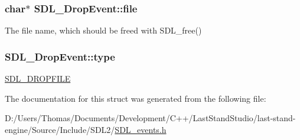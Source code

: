 \subsubsection[{file}]{\setlength{\rightskip}{0pt plus 5cm}char$\ast$ S\+D\+L\+\_\+\+Drop\+Event\+::file}\label{structSDL__DropEvent_abc41ef4beb62e1d8b56827128b29585f}
The file name, which should be freed with S\+D\+L\+\_\+free() \hypertarget{structSDL__DropEvent_a5ea27cfaa5f8d4940e9a69b68b3cc035}{}
\subsubsection[{type}]{ S\+D\+L\+\_\+\+Drop\+Event\+::type}\label{structSDL__DropEvent_a5ea27cfaa5f8d4940e9a69b68b3cc035}
\hyperlink{SDL__events_8h_a3b589e89be6b35c02e0dd34a55f3fccaad9238862d7aeaebff88be6453ee0fbab}{S\+D\+L\+\_\+\+D\+R\+O\+P\+F\+I\+L\+E} 

The documentation for this struct was generated from the following file\+:\begin{DoxyCompactItemize}
\item 
D\+:/\+Users/\+Thomas/\+Documents/\+Development/\+C++/\+Last\+Stand\+Studio/last-\/stand-\/engine/\+Source/\+Include/\+S\+D\+L2/\hyperlink{SDL__events_8h}{S\+D\+L\+\_\+events.\+h}\end{DoxyCompactItemize}
